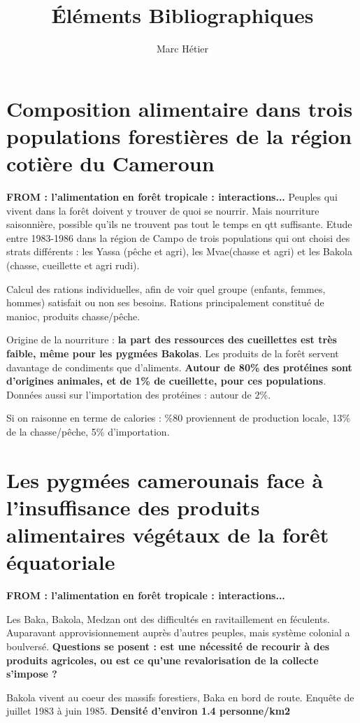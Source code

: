 \documentclass{article}
\title{Éléments Bibliographiques}
\author{Marc Hétier}
\begin{document}
\maketitle

\section{Composition alimentaire dans trois populations forestières de la région cotière du Cameroun}
\textbf{FROM : l'alimentation en forêt tropicale : interactions...}
Peuples qui vivent dans la forêt doivent y trouver de quoi se nourrir. Mais nourriture saisonnière, possible qu'ils ne trouvent pas tout le temps en qtt suffisante. Etude entre 1983-1986 dans la région de Campo de trois populations qui ont choisi des strats différents : les Yassa (pêche et agri), les Mvae(chasse et agri) et les Bakola (chasse, cueillette et agri rudi).

Calcul des rations individuelles, afin de voir quel groupe (enfants, femmes, hommes) satisfait ou non ses besoins. Rations principalement constitué de manioc, produits chasse/pêche.

Origine de la nourriture : \textbf{la part des ressources des cueillettes est très faible, même pour les pygmées Bakolas}. Les produits de la forêt servent davantage de condiments que d'aliments. \textbf{Autour de 80\% des protéines sont d'origines animales, et de 1\% de cueillette, pour ces populations}. Données aussi sur l'importation des protéines : autour de 2\%.

Si on raisonne en terme de calories : \%80 proviennent de production locale, 13\% de la chasse/pêche, 5\% d'importation.

\section{Les pygmées camerounais face à l'insuffisance des produits alimentaires végétaux de la forêt équatoriale}
\textbf{FROM : l'alimentation en forêt tropicale : interactions...}

Les Baka, Bakola, Medzan ont des difficultés en ravitaillement en féculents. Auparavant approvisionnement auprès d'autres peuples, mais système colonial a boulversé. \textbf{Questions se posent : est une nécessité de recourir à des produits agricoles, ou est ce qu'une revalorisation de la collecte s'impose ?}

Bakola vivent au coeur des massifs forestiers, Baka en bord de route. Enquête de juillet 1983 à juin 1985.
\textbf{Densité d'environ 1.4 personne/km2}
\end{document}
